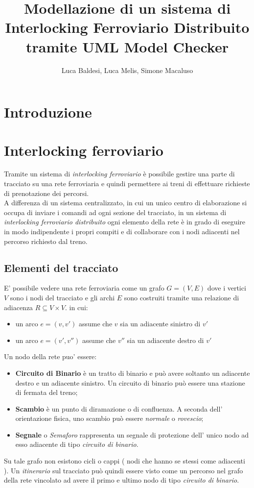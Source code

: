 \documentclass[10pt,a4paper,oneside]{report}
\author{Luca Baldesi, Luca Melis, Simone Macaluso}
\title{Modellazione di un sistema di
Interlocking Ferroviario Distribuito
tramite UML Model Checker
}
\begin{document}
\maketitle
\tableofcontents
\chapter*{Introduzione}
\chapter{Interlocking ferroviario}
Tramite un sistema di \textit{interlocking ferroviario} è possibile gestire una parte di tracciato su una rete ferroviaria e quindi permettere ai treni di effettuare richieste di prenotazione dei percorsi.\\
A differenza di un sistema centralizzato, in cui un unico centro di elaborazione si occupa di inviare i comandi ad ogni sezione del tracciato, in un sistema di \textit{interlocking ferroviario distribuito} ogni elemento della rete è in grado di eseguire in modo indipendente i propri compiti e di collaborare con i nodi adiacenti nel percorso richiesto dal treno.
\section{Elementi del tracciato} 
E' possibile vedere una rete ferroviaria come un grafo $G =(V,E) $ dove i vertici $V$ sono i nodi del tracciato e gli archi $E$ sono costruiti tramite una relazione di adiacenza $R \subseteq V \times V$. in cui:
\begin{itemize}
\item un arco $e=(v,v')$ assume che $v$ sia un adiacente sinistro di $v'$ 
\item un arco $e=(v',v'')$ assume che $v''$ sia un adiacente destro di $v'$ 
\end{itemize}
Un nodo della rete puo' essere:
\begin{itemize}
\item \textbf{Circuito di Binario} è un tratto di binario e può avere soltanto un adiacente destro e un adiacente sinistro. Un circuito di binario può essere una stazione di fermata del treno;
\item \textbf{Scambio} è un punto di diramazione o di confluenza. A seconda dell' orientazione fisica, uno scambio può essere \textit{normale} o \textit{rovescio}; 
\item \textbf{Segnale} o \emph{Semaforo} rappresenta un segnale di protezione dell' unico nodo ad esso adiacente di tipo \emph{circuito di binario}.
\end{itemize}
Su tale grafo non esistono cicli o cappi ( nodi che hanno se stessi come adiacenti ).
Un \emph{itinerario} sul tracciato può quindi essere visto come un percorso nel grafo della rete vincolato ad avere il primo e ultimo nodo di tipo \emph{circuito di binario}.
\end{document}
